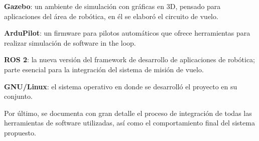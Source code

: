 \textbf{Gazebo}: un ambiente de simulación con gráficas en 3D, pensado para aplicaciones del área de robótica, en él se elaboró el circuito de vuelo. 

\textbf{ArduPilot}: un firmware para pilotos automáticos que ofrece herramientas para realizar simulación de software in the loop.

\textbf{ROS 2}: la nueva versión del framework de desarrollo de aplicaciones de robótica; parte esencial para la integración del sistema de misión de vuelo.

\textbf{GNU/Linux}:  el sistema operativo en donde se desarrolló el proyecto en su conjunto.


Por último, se documenta con gran detalle el proceso de integración de todas las herramientas de software utilizadas, así como el comportamiento final del sistema propuesto.










